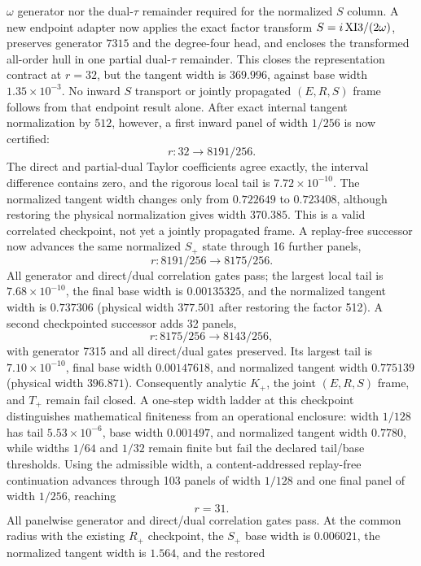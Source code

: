 \documentclass[11pt]{article}
\theoremstyle{definition}
\theoremstyle{remark}
\begin{document}
\(\omega\) generator nor the dual-\(\tau\) remainder required for the
normalized \(S\) column.  A new endpoint adapter now applies the exact
factor transform \(S=i\,{\rm XI3}/(2\omega)\), preserves generator \(7315\)
and the degree-four head, and encloses the transformed all-order hull in one
partial dual-\(\tau\) remainder.  This closes the representation contract at
\(r=32\), but the tangent width is \(369.996\), against base width
\(1.35\times10^{-3}\).  No inward \(S\) transport or jointly propagated
\((E,R,S)\) frame follows from that endpoint result alone.  After exact
internal tangent normalization by \(512\), however, a first inward panel of
width \(1/256\) is now certified:
\[
 r:32\longrightarrow 8191/256 .
\]
The direct and partial-dual Taylor coefficients agree exactly, the interval
difference contains zero, and the rigorous local tail is
\(7.72\times10^{-10}\).  The normalized tangent width changes only from
\(0.722649\) to \(0.723408\), although restoring the physical normalization
gives width \(370.385\).  This is a valid correlated checkpoint, not yet a
jointly propagated frame.  A replay-free successor now advances the same
normalized \(S_+\) state through 16 further panels,
\[
 r:8191/256\longrightarrow8175/256 .
\]
All generator and direct/dual correlation gates pass; the largest local
tail is \(7.68\times10^{-10}\), the final base width is \(0.00135325\), and
the normalized tangent width is \(0.737306\) (physical width \(377.501\)
after restoring the factor 512).  A second checkpointed successor adds
32 panels,
\[
 r:8175/256\longrightarrow8143/256 ,
\]
with generator 7315 and all direct/dual gates preserved.  Its largest tail
is \(7.10\times10^{-10}\), final base width \(0.00147618\), and normalized
tangent width \(0.775139\) (physical width \(396.871\)).  Consequently
analytic \(K_+\), the joint \((E,R,S)\) frame, and \(T_+\) remain fail
closed.  A one-step width ladder at this checkpoint distinguishes
mathematical finiteness from an operational enclosure: width \(1/128\)
has tail \(5.53\times10^{-6}\), base width \(0.001497\), and normalized
tangent width \(0.7780\), while widths \(1/64\) and \(1/32\) remain finite
but fail the declared tail/base thresholds.  Using the admissible width,
a content-addressed replay-free continuation advances through 103 panels
of width \(1/128\) and one final panel of width \(1/256\), reaching
\[
 r=31 .
\]
All panelwise generator and direct/dual correlation gates pass.  At the
common radius with the existing \(R_+\) checkpoint, the \(S_+\) base width
is \(0.006021\), the normalized tangent width is \(1.564\), and the restored
\end{document}
